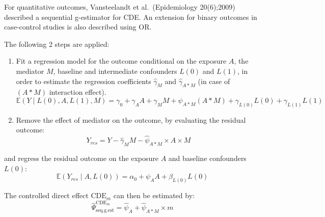 \documentclass[
]{book}
\begin{document}
For quantitative outcomes, Vansteelandt et al.~(Epidemiology 20(6);2009) described a sequential g-estimator for CDE. An extension for binary outcomes in case-control studies is also described using OR.

The following 2 steps are applied:

\begin{enumerate}
\def\labelenumi{\arabic{enumi}.}
\item
  Fit a regression model for the outcome conditional on the exposure \(A\), the mediator \(M\), baseline and intermediate confounders \(L(0)\) and \(L(1)\), in order to estimate the regression coefficients \(\hat{\gamma}_{M}\) and \(\hat{\gamma}_{A \ast M}\) (in case of \((A \ast M)\) interaction effect).
  \begin{equation}
  \mathbb{E}(Y\mid L(0),A,L(1),M) = \gamma_0 + \gamma_A A + \gamma_M M + \psi_{A \ast M} (A \ast M) + \gamma_{L(0)} L(0) + \gamma_{L(1)} L(1)
  \end{equation}
\item
  Remove the effect of mediator on the outcome, by evaluating the residual outcome:
  \begin{equation}
  Y_{res} = Y - \hat{\gamma}_M M - \hat{\psi}_{A \ast M} \times A \times M
  \end{equation}
\end{enumerate}

and regress the residual outcome on the exposure \(A\) and baseline confounders \(L(0)\):
\begin{equation}
\mathbb{E}(Y_{res}\mid A, L(0)) = \alpha_0 + \psi_A A + \beta_{L(0)} L(0)
\end{equation}

The controlled direct effect \(\text{CDE}_m\) can then be estimated by:
\begin{equation}
\hat{\Psi}^{\text{CDE}_m}_{\text{seq.g.est}} = \hat{\psi}_A + \hat{\psi}_{A \ast M} \times m
\end{equation}
\end{document}
